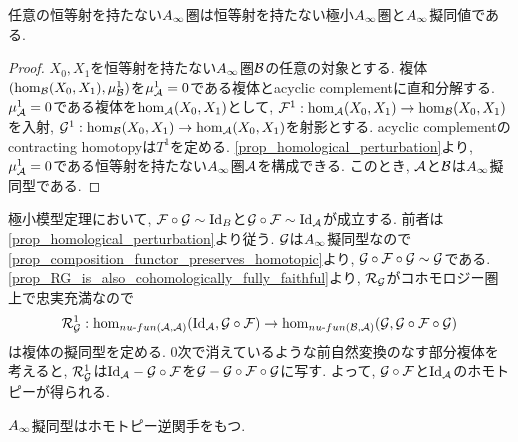 \documentclass[uplatex, a4paper, 14Q, dvipdfmx]{jsarticle}
\begin{document}

\begin{theorem}[極小模型定理] \label{prop_minimal_model_theorem}
  任意の恒等射を持たない$A_{\infty}$圏は恒等射を持たない極小$A_{\infty}$圏と$A_{\infty}$擬同値である. 
\end{theorem}

\begin{proof}
  $X_0,X_1$を恒等射を持たない$A_{\infty}$圏$\mathcal{B}$の任意の対象とする. 
  複体$(\hom_{\mathcal{B}}(X_0,X_1), \mu^1_{\mathcal{B}})$を$\mu^1_{\mathcal{A}}= 0$である複体とacyclic complementに直和分解する. 
  $\mu^1_{\mathcal{A}}=0$である複体を$\hom_{\mathcal{A}}(X_0,X_1)$として, $\mathcal{F}^1 : \hom_{\mathcal{A}}(X_0,X_1) \to \hom_{\mathcal{B}}(X_0,X_1)$を入射, $\mathcal{G}^1 : \hom_{\mathcal{B}}(X_0,X_1) \to \hom_{\mathcal{A}}(X_0,X_1)$を射影とする. 
  acyclic complementのcontracting homotopyは$T^1$を定める. 
  \cref{prop_homological_perturbation}より, $\mu^1_{\mathcal{A}}=0$である恒等射を持たない$A_{\infty}$圏$\mathcal{A}$を構成できる. 
  このとき, $\mathcal{A}$と$\mathcal{B}$は$A_{\infty}$擬同型である.
\end{proof}

\begin{remark}
  極小模型定理において, $\mathcal{F} \circ \mathcal{G} \sim \mathrm{Id}_B$と$\mathcal{G} \circ \mathcal{F} \sim \mathrm{Id}_{\mathcal{A}}$が成立する. 
  前者は\cref{prop_homological_perturbation}より従う. 
  $\mathcal{G}$は$A_{\infty}$擬同型なので\cref{prop_composition_functor_preserves_homotopic}より, $\mathcal{G} \circ \mathcal{F} \circ \mathcal{G} \sim \mathcal{G}$である.
  \cref{prop_RG_is_also_cohomologically_fully_faithful}より, $\mathcal{R}_{\mathcal{G}}$がコホモロジー圏上で忠実充満なので
  \begin{align*}
    \mathcal{R}_{\mathcal{G}}^1 : \hom_{nu \text{-} fun (\mathcal{A}, \mathcal{A})}(\mathrm{Id}_{\mathcal{A}}, \mathcal{G} \circ\mathcal{F}) \to \hom_{nu \text{-} fun (\mathcal{B}, \mathcal{A})}(\mathcal{G}, \mathcal{G} \circ \mathcal{F} \circ \mathcal{G})
  \end{align*}
  は複体の擬同型を定める. 
  $0$次で消えているような前自然変換のなす部分複体を考えると, $\mathcal{R}_{\mathcal{G}}^1$は$\mathrm{Id}_{\mathcal{A}} - \mathcal{G} \circ\mathcal{F}$を$\mathcal{G} - \mathcal{G} \circ \mathcal{F} \circ \mathcal{G}$に写す. 
  よって, $\mathcal{G} \circ \mathcal{F}$と$\mathrm{Id}_{\mathcal{A}}$のホモトピーが得られる. 
\end{remark}

\begin{corollary} \label{prop_Ainf_qis_has_homotopy_inverse}
  $A_{\infty}$擬同型はホモトピー逆関手をもつ. 
\end{corollary}
\end{document}
